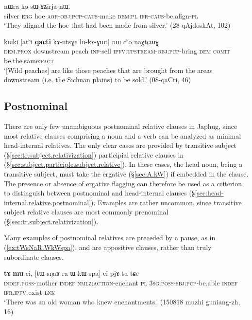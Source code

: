 \begin{exe}
\ex \label{ex:qaR.thWkAsWBzu}
 nɯra ko-sɯ-ɤʑirja-nɯ. \\
silver \textsc{erg} hoe \textsc{aor}-\textsc{obj}:\textsc{pcp}-\textsc{caus}-make \textsc{dem}:\textsc{pl} \textsc{ifr}-\textsc{caus}-be.align-\textsc{pl} \\
\glt `They aligned the hoe that had been made from silver.' (28-qAjdoskAt, 102)
\end{exe}  

\begin{exe}
\ex \label{ex:kAntsGe.lukAGWt}
\gll kɯki [atʰi \textbf{qaɕti} kɤ-ntsɣe lu-kɤ-ɣɯt] nɯ cʰo naχtɕɯɣ \\
\textsc{dem}.\textsc{prox} downstream peach \textsc{inf}-sell \textsc{ipfv}:\textsc{upstream}-\textsc{obj}:\textsc{pcp}-bring \textsc{dem} \textsc{comit} be.the.same:\textsc{fact} \\
\glt `[Wild peaches] are  like those peaches that are brought from the areas downstream (i.e. the Sichuan plains) to be sold.' (08-qaCti, 46)
\end{exe}  
 
 \subsection{Postnominal} \label{sec:postnominal.relative}
 There are only few unambiguous postnominal relative clauses in Japhug, since most relative clauses comprising a noun and a verb can be analyzed as minimal head-internal relatives. The only clear cases are provided by transitive subject (§\ref{sec:tr.subject.relativization}) participial relative clauses in  (§\ref{sec:subject.participle.subject.relative}). In these cases, the head noun, being a transitive subject,  must take the ergative  (§\ref{sec:A.kW}) if embedded in the clause. The presence or absence of ergative flagging can therefore be used as a criterion to distinguish between postnominal and head-internal clauses (§\ref{sec:head-internal.relative.postnominal}). Examples are rather uncommon, since transitive subject relative clauses are most commonly prenominal (§\ref{sec:tr.subject.relativization}). 

Many examples of postnominal relatives are preceded by a pause, as in (\ref{ex:tWsNaR.WkWspa}), and are appositive clauses, rather than truly subordinate clauses. 

 \begin{exe}
\ex \label{ex:tWsNaR.WkWspa}
\gll \textbf{tɤ}-\textbf{mu} ci, [tɯ-sŋaʁ ra ɯ-kɯ-spa] ci pjɤ-tu tɕe \\
\textsc{indef}.\textsc{poss}-mother \textsc{indef} \textsc{nmlz}:\textsc{action}-enchant \textsc{pl} \textsc{3sg}.\textsc{poss}-\textsc{sbj}:\textsc{pcp}-be.able \textsc{indef} \textsc{ifr}.\textsc{ipfv}-exist \textsc{lnk} \\
\glt `There was an old woman who knew enchantments.' (150818 muzhi guniang-zh, 16)
\end{exe}
 
